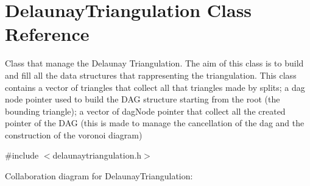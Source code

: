 \hypertarget{classDelaunayTriangulation}{}\section{Delaunay\+Triangulation Class Reference}
\label{classDelaunayTriangulation}


Class that manage the Delaunay Triangulation. The aim of this class is to build and fill all the data structures that rappresenting the triangulation. This class contains a vector of triangles that collect all that triangles made by splits; a dag node pointer used to build the D\+AG structure starting from the root (the bounding triangle); a vector of dag\+Node pointer that collect all the created pointer of the D\+AG (this is made to manage the cancellation of the dag and the construction of the voronoi diagram)  




{\ttfamily \#include $<$delaunaytriangulation.\+h$>$}



Collaboration diagram for Delaunay\+Triangulation\+:

